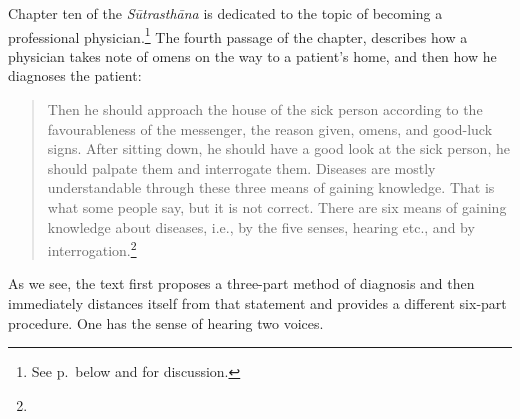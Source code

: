 Chapter ten of the \emph{Sūtrasthāna} is dedicated to the topic of becoming a 
professional physician.\footnote{See p.\,\pageref{visikhapravesaniyam} below and 
\cite{wuja-2025} for discussion.}
The fourth passage of the chapter, describes how a physician takes note of omens 
on the way to a patient’s home, and then how he diagnoses the patient:
\begin{quote}
    Then he should approach the house of the sick person according to
the favourableness of the messenger, the reason given, omens, and
good-luck signs. After sitting down, he should have a good look at
the sick person, he should palpate them and interrogate them.
Diseases are mostly understandable through these three means of
gaining knowledge. That is what some people say, but it is not
correct. There are six means of gaining knowledge about diseases,
i.e., by the five senses, hearing etc., and by
interrogation.\footnote{}
\end{quote}
As we see, the text first proposes a three-part method of diagnosis
and then immediately distances itself from that statement and provides
a different six-part procedure. One has the sense of hearing two
voices.

